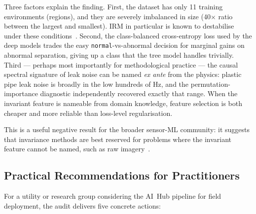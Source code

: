 \documentclass[sensors,article,submit,pdftex,oneauthor]{Definitions/mdpi}
\begin{document}
Three factors explain the finding. First, the dataset has
only 11 training environments (regions), and they are
severely imbalanced in size (40$\times$ ratio between the
largest and smallest). IRM in particular is known to
destabilise under these
conditions~\cite{gulrajani2021dg,rosenfeld2021irm}. Second,
the class-balanced cross-entropy loss used by the deep
models trades the easy \texttt{normal}-vs-abnormal decision
for marginal gains on abnormal separation, giving up a
class that the tree model handles trivially. Third ---
perhaps most importantly for methodological practice --- the
causal spectral signature of leak noise can be named
\emph{ex ante} from the physics: plastic pipe leak noise is
broadly in the low hundreds of Hz, and the permutation-
importance diagnostic independently recovered exactly that
range. When the invariant feature is nameable from domain
knowledge, feature selection is both cheaper and more
reliable than loss-level regularisation.

This is a useful negative result for the broader sensor-ML
community: it suggests that invariance methods are best
reserved for problems where the invariant feature cannot be
named, such as raw imagery~\cite{beery2018terra}.

\subsection{Practical Recommendations for Practitioners}

For a utility or research group considering the AI~Hub pipeline
for field deployment, the audit delivers five concrete actions:
\end{document}
